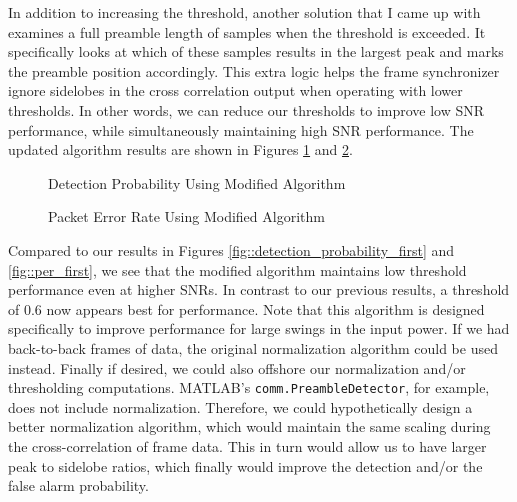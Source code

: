 \documentclass{article}
\begin{document}
	In addition to increasing the threshold, another solution that I came up with examines a full preamble length of samples when the threshold is exceeded. It specifically looks at which of these samples results in the largest peak and marks the preamble position accordingly. This extra logic helps the frame synchronizer ignore sidelobes in the cross correlation output when operating with lower thresholds. In other words, we can reduce our thresholds to improve low SNR performance, while simultaneously maintaining high SNR performance. The updated algorithm results are shown in Figures \ref{fig::detection_probability_mod} and \ref{fig::per_mod}.
	
\begin{figure}[H]
	\centerline{}
	\caption{Detection Probability Using Modified Algorithm}
	\label{fig::detection_probability_mod}
\end{figure}

\begin{figure}[H]
	\centerline{}
	\caption{Packet Error Rate Using Modified Algorithm}
	\label{fig::per_mod}
\end{figure}

\noindent Compared to our results in Figures \ref{fig::detection_probability_first} and \ref{fig::per_first}, we see that the modified algorithm maintains low threshold performance even at higher SNRs. In contrast to our previous results, a threshold of 0.6 now appears best for performance. Note that this algorithm is designed specifically to improve performance for large swings in the input power. If we had back-to-back frames of data, the original normalization algorithm could be used instead. Finally if desired, we could also offshore our normalization and/or thresholding computations. MATLAB's \texttt{comm.PreambleDetector}, for example, does not include normalization. Therefore, we could hypothetically design a better normalization algorithm, which would maintain the same scaling during the cross-correlation of frame data. This in turn would allow us to have larger peak to sidelobe ratios, which finally would improve the detection and/or the false alarm probability.
\end{document}

